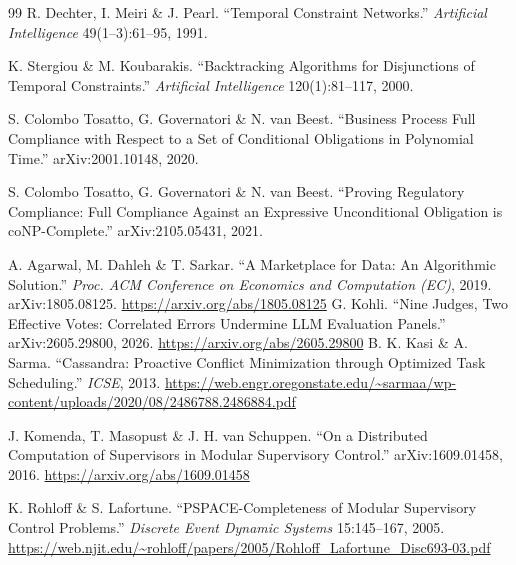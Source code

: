 \documentclass[11pt,a4paper]{article}
\theoremstyle{definition}
\theoremstyle{definition}
\theoremstyle{remark}
\begin{document}
\begin{thebibliography}{99}
 R. Dechter, I. Meiri \& J. Pearl. ``Temporal Constraint Networks.''
\emph{Artificial Intelligence} 49(1--3):61--95, 1991.

 K. Stergiou \& M. Koubarakis. ``Backtracking Algorithms for
Disjunctions of Temporal Constraints.'' \emph{Artificial Intelligence}
120(1):81--117, 2000.

 S. Colombo Tosatto, G. Governatori \& N. van Beest. ``Business
Process Full Compliance with Respect to a Set of Conditional Obligations in
Polynomial Time.'' arXiv:2001.10148, 2020.

 S. Colombo Tosatto, G. Governatori \& N. van Beest. ``Proving
Regulatory Compliance: Full Compliance Against an Expressive Unconditional
Obligation is coNP-Complete.'' arXiv:2105.05431, 2021.

 A. Agarwal, M. Dahleh \& T. Sarkar. ``A Marketplace
for Data: An Algorithmic Solution.'' \emph{Proc. ACM Conference on Economics and
Computation (EC)}, 2019. arXiv:1805.08125.
\url{https://arxiv.org/abs/1805.08125}
 G. Kohli. ``Nine Judges, Two Effective Votes: Correlated
Errors Undermine LLM Evaluation Panels.'' arXiv:2605.29800, 2026.
\url{https://arxiv.org/abs/2605.29800}
 B. K. Kasi \& A. Sarma. ``Cassandra: Proactive Conflict
Minimization through Optimized Task Scheduling.'' \emph{ICSE}, 2013.
\url{https://web.engr.oregonstate.edu/~sarmaa/wp-content/uploads/2020/08/2486788.2486884.pdf}

 J. Komenda, T. Masopust \& J. H. van Schuppen. ``On a
Distributed Computation of Supervisors in Modular Supervisory Control.''
arXiv:1609.01458, 2016. \url{https://arxiv.org/abs/1609.01458}

 K. Rohloff \& S. Lafortune. ``PSPACE-Completeness of Modular
Supervisory Control Problems.'' \emph{Discrete Event Dynamic Systems} 15:145--167,
2005. \url{https://web.njit.edu/~rohloff/papers/2005/Rohloff_Lafortune_Disc693-03.pdf}
\end{thebibliography}
\end{document}
